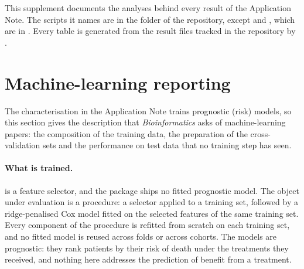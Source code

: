 
\noindent This supplement documents the analyses behind every result of the Application
Note. The scripts it names are in the folder  of
the repository, except  and , which are in
.
Every table is generated from the result files tracked in the repository by
.

\section{Machine-learning reporting}\label{S-sec:ml}

The characterisation in the Application Note trains prognostic (risk) models, so this section
gives the description that \emph{Bioinformatics} asks of machine-learning papers: the
composition of the training data, the preparation of the cross-validation sets and the
performance on test data that no training step has seen.

\paragraph{What is trained.}  is a feature selector, and the package ships
no fitted prognostic model. The object under evaluation is a procedure: a selector
applied to a training set, followed by a ridge-penalised Cox model \citep{simon2011}
fitted on the selected features of the same training set. Every component of the
procedure is refitted from scratch on each training set, and no fitted model is reused
across folds or across cohorts. The models are prognostic: they rank patients by their risk
of death under the treatments they received, and nothing here addresses the prediction of
benefit from a treatment.

